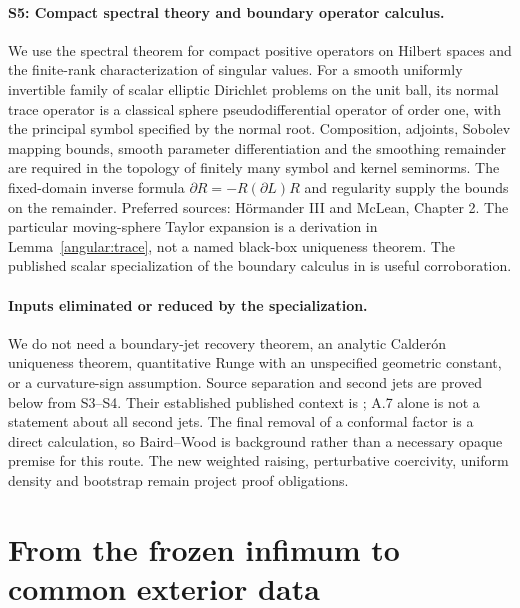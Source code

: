 \documentclass[11pt]{article}
\theoremstyle{definition}
\theoremstyle{remark}
\numberwithin{equation}{section}
\begin{document}
\paragraph{S5: Compact spectral theory and boundary operator calculus.}
We use the spectral theorem for compact positive operators on Hilbert
spaces and the finite-rank characterization of singular values. For a
smooth uniformly invertible family of scalar elliptic Dirichlet problems
on the unit ball, its normal trace operator is a classical sphere
pseudodifferential operator of order one, with the principal symbol
specified by the normal root. Composition, adjoints, Sobolev mapping
bounds, smooth parameter differentiation and the smoothing remainder
are required in the topology of finitely many symbol and kernel seminorms.
The fixed-domain inverse formula $\partial R=-R(\partial L)R$ and
regularity supply the bounds on the remainder. Preferred sources:
H\"ormander III and McLean, Chapter 2. The particular moving-sphere Taylor
expansion is a derivation in Lemma~\ref{angular:trace}, not a named
black-box uniqueness theorem. The published scalar specialization of the
boundary calculus in \cite{JoshiLionheart2005} is useful corroboration.

\paragraph{Inputs eliminated or reduced by the specialization.}
We do not need a boundary-jet recovery theorem, an analytic Calder\'on
uniqueness theorem, quantitative Runge with an unspecified geometric
constant, or a curvature-sign assumption. Source separation and second
jets are proved below from S3--S4. Their established published context
is \cite[Appendix A]{LLS20}; A.7 alone is not a statement about all second
jets. The final removal of a conformal factor is a direct calculation,
so Baird--Wood \cite{BairdWood2003} is background rather than a necessary
opaque premise for this route. The new weighted raising, perturbative
coercivity, uniform density and bootstrap remain project proof obligations.

\section{From the frozen infimum to common exterior data}\label{data:section}
\end{document}
